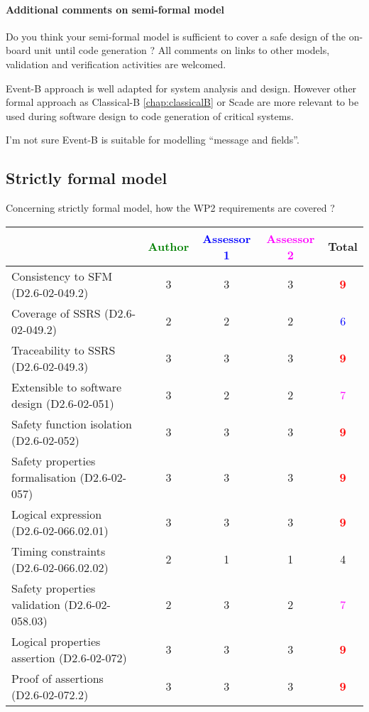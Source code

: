 \paragraph{Additional comments on semi-formal  model} Do you think your semi-formal  model is sufficient to cover a safe design of the on-board unit until code generation ?
All comments on links to  other models, validation and verification activities are welcomed.


\begin{author_comment}
Event-B  approach is well adapted for system analysis and design. However other formal approach as Classical-B \ref{chap:classicalB} or Scade are more relevant to be used during software design to code generation of critical systems.
\end{author_comment}


\begin{assessor1}
I'm not sure Event-B is suitable for modelling ``message and fields''.
\end{assessor1}


\subsection{Strictly formal model}

Concerning strictly formal model, how the WP2 requirements are covered ?

\begin{tabular}{|l | c | c | c | c|}
\hline
& \textcolor{green}{Author} & \textcolor{blue}{Assessor 1} & \textcolor{magenta}{Assessor 2} & Total \\
\hline 
Consistency to SFM (D2.6-02-049.2) & 3     & 3     & 3     & \textcolor{red}{\textbf{9}} \\
\hline
Coverage of SSRS (D2.6-02-049.2)  & 2     & 2     & 2     & \textcolor{blue}{6} \\
\hline
Traceability to  SSRS (D2.6-02-049.3)  & 3     & 3     & 3     & \textcolor{red}{\textbf{9}} \\
\hline
Extensible to software design (D2.6-02-051)  & 3     & 2     & 2     & \textcolor{magenta}{7} \\
\hline
Safety function isolation (D2.6-02-052)  & 3     & 3     & 3     & \textcolor{red}{\textbf{9}} \\
\hline 
Safety properties formalisation (D2.6-02-057)  & 3     & 3     & 3     & \textcolor{red}{\textbf{9}} \\
\hline
Logical expression (D2.6-02-066.02.01)  & 3     & 3     & 3     & \textcolor{red}{\textbf{9}} \\
\hline
Timing constraints (D2.6-02-066.02.02)  & 2     & 1     & 1     & 4     \\
\hline
Safety properties validation (D2.6-02-058.03)  & 2     & 3     & 2     & \textcolor{magenta}{7} \\
\hline
Logical properties assertion (D2.6-02-072)  & 3     & 3     & 3     & \textcolor{red}{\textbf{9}} \\
\hline
Proof of assertions (D2.6-02-072.2)  & 3     & 3     & 3     & \textcolor{red}{\textbf{9}} \\
\hline
\end{tabular}

